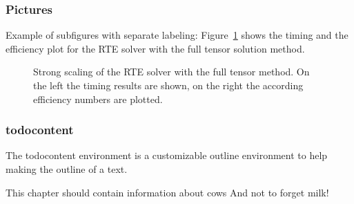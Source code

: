 \subsubsection{Pictures}
Example of subfigures with separate labeling:
Figure~\ref{fig:strongscalingfull} shows the timing  and the efficiency plot  for the RTE solver with the full tensor solution method.
\begin{figure}[h]
    \centering
    \caption{Strong scaling of the RTE solver with the full tensor method. On the left the timing results are shown, on the right the according efficiency numbers are plotted.}
    \label{fig:strongscalingfull}
\end{figure}

\subsubsection{todocontent}
The todocontent environment is a customizable outline environment to help making the outline of a text.
\begin{todocontent}
    \1 This chapter should contain information about cows
    \1 And not to forget milk!
\end{todocontent}
